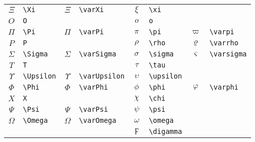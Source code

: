 \begin{table}[h]
\begin{tabular}{c@{ }l c@{ }l c@{ }l c@{ }l}
		$\Xi$      & \verb|\Xi|      & $\varXi$      & \verb|\varXi|      & $\xi$      & \verb|\xi|      &               &                    \\
		$O$        & \verb|O|        &               &                    & $o$        & \verb|o|        &               &                    \\
		$\Pi$      & \verb|\Pi|      & $\varPi$      & \verb|\varPi|      & $\pi$      & \verb|\pi|      & $\varpi$      & \verb|\varpi|      \\
		$P$        & \verb|P|        &               &                    & $\rho$     & \verb|\rho|     & $\varrho$     & \verb|\varrho|     \\
		$\Sigma$   & \verb|\Sigma|   & $\varSigma$   & \verb|\varSigma|   & $\sigma$   & \verb|\sigma|   & $\varsigma$   & \verb|\varsigma|   \\
		$T$        & \verb|T|        &               &                    & $\tau$     & \verb|\tau|     &               &                    \\
		$\Upsilon$ & \verb|\Upsilon| & $\varUpsilon$ & \verb|\varUpsilon| & $\upsilon$ & \verb|\upsilon| &               &                    \\
		$\Phi$     & \verb|\Phi|     & $\varPhi$     & \verb|\varPhi|     & $\phi$     & \verb|\phi|     & $\varphi$     & \verb|\varphi|     \\
		$X$        & \verb|X|        &               &                    & $\chi$     & \verb|\chi|     &               &                    \\
		$\Psi$     & \verb|\Psi|     & $\varPsi$     & \verb|\varPsi|     & $\psi$     & \verb|\psi|     &               &                    \\
		$\Omega$   & \verb|\Omega|   & $\varOmega$   & \verb|\varOmega|   & $\omega$   & \verb|\omega|   &               &                    \\
		           &                 &               &                    & $\digamma$ & \verb|\digamma| &               &                    \\
		\hline
	\end{tabular}
\end{table}
%

\newpage
